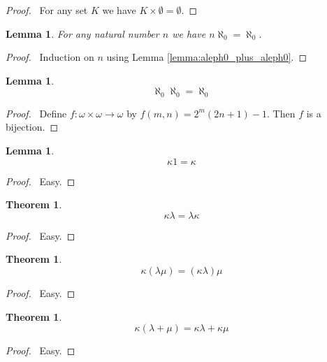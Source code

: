\documentclass{report}
\let\qed\relax
\newtheorem{lemma}[axiom]{Lemma}
\newtheorem{theorem}[axiom]{Theorem}
\theoremstyle{definition}
\begin{document}
    \begin{proof}
        \pf\ For any set $K$ we have $K \times \emptyset = \emptyset$. \qed
    \end{proof}

    \begin{lemma}
        For any natural number $n$ we have $n \aleph_0 = \aleph_0$.
    \end{lemma}

    \begin{proof}
        \pf\ Induction on $n$ using Lemma \ref{lemma:aleph0_plus_aleph0}. \qed
    \end{proof}

    \begin{lemma}
        \[ \aleph_0 \aleph_0 = \aleph_0 \]
    \end{lemma}

    \begin{proof}
        \pf\ Define $f : \omega \times \omega \rightarrow \omega$ by $f(m,n) = 2^m(2n+1)-1$. Then $f$
        is a bijection. \qed
    \end{proof}

    \begin{lemma}
        \[ \kappa 1 = \kappa \]
    \end{lemma}

    \begin{proof}
        \pf\ Easy. \qed
    \end{proof}

    \begin{theorem}
        \[ \kappa \lambda = \lambda \kappa \]
    \end{theorem}

    \begin{proof}
        \pf\ Easy. \qed
    \end{proof}

    \begin{theorem}
        \[ \kappa (\lambda \mu) = (\kappa \lambda) \mu \]
    \end{theorem}

    \begin{proof}
        \pf\ Easy. \qed
    \end{proof}

    \begin{theorem}
        \[ \kappa (\lambda + \mu) = \kappa \lambda + \kappa \mu \]
    \end{theorem}

    \begin{proof}
        \pf\ Easy. \qed
    \end{proof}
\end{document}
